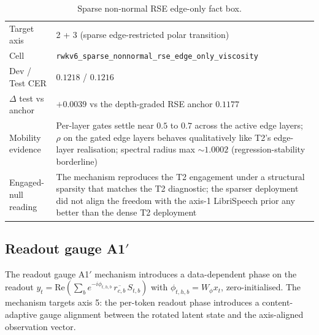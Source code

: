 \begin{table}[h]
\centering
\small
\caption[Sparse non-normal RSE engaged-null entry]{Sparse non-normal
RSE edge-only fact box.}
\label{tab:engaged-null:s9b}
\setlength{\tabcolsep}{6pt}
\renewcommand{\arraystretch}{1.05}
\begin{tabularx}{\linewidth}{@{}p{3.3cm} X@{}}
\toprule
Target axis & 2 + 3 (sparse edge-restricted polar transition) \\
Cell & \texttt{rwkv6\_sparse\_nonnormal\_rse\_edge\_only\_viscosity} \\
Dev / Test CER & $0.1218$ / $0.1216$ \\
$\Delta$ test vs anchor & $+0.0039$ vs the depth-graded RSE anchor
$0.1177$ \\
Mobility evidence & Per-layer gates settle near $0.5$ to $0.7$ across
the active edge layers; $\rho$ on the gated edge layers behaves
qualitatively like T2's edge-layer realisation; spectral radius max
$\sim 1.0002$ (regression-stability borderline) \\
Engaged-null reading & The mechanism reproduces the T2 engagement
under a structural sparsity that matches the T2 diagnostic; the
sparser deployment did not align the freedom with the axis-1
LibriSpeech prior any better than the dense T2 deployment \\
\bottomrule
\end{tabularx}
\end{table}

\subsection{Readout gauge A1$'$}\label{app:engaged-null:a1prime}

The readout gauge A1$'$ mechanism introduces a data-dependent phase
on the readout
$y_{t} = \mathrm{Re}\!\left( \sum_{b} e^{-i \phi_{t, h, b}}\,
\overline{r_{c, b}}\, S_{t, b} \right)$ with
$\phi_{t, h, b} = W_{\phi} x_{t}$, zero-initialised. The mechanism
targets axis 5: the per-token readout phase introduces a
content-adaptive gauge alignment between the rotated latent state
and the axis-aligned observation vector.

